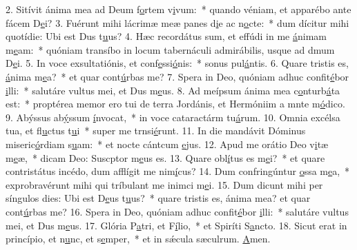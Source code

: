 2. Sitívit ánima mea ad Deum f\uline{o}rtem v\uline{i}vum:~* quando véniam, et apparébo ante fácem D\uline{e}i?
3. Fuérunt mihi lácrimæ meæ panes d\uline{i}e ac n\uline{o}cte:~* dum dícitur mihi quotídie: Ubi est Dus t\uline{u}us?
4. Hæc recordátus sum, et effúdi in me \uline{á}nimam m\uline{e}am:~* quóniam transíbo in locum tabernáculi admirábilis, usque ad dmum D\uline{e}i.
5. In voce exsultatiónis, et conf\uline{e}ssi\uline{ó}nis:~* sonus pul\uline{á}ntis.
6. Quare tristis es, \uline{á}nima m\uline{e}a?~* et quar cont\uline{ú}rbas me?
7. Spera in Deo, quóniam adhuc confit\uline{é}bor \uline{i}lli:~* salutáre vultus mei, et Dus m\uline{e}us.
8. Ad meípsum ánima mea c\uline{o}nturb\uline{á}ta est:~* proptérea memor ero tui de terra Jordánis, et Hermóniim a mnte m\uline{ó}dico.
9. Abýssus ab\uline{ý}ssum \uline{í}nvocat,~* in voce cataractárm tu\uline{á}rum.
10. Omnia excélsa tua, et fl\uline{u}ctus t\uline{u}i~* super me trnsi\uline{é}runt.
11. In die mandávit Dóminus miseric\uline{ó}rdiam s\uline{u}am:~* et nocte cántcum \uline{e}jus.
12. Apud me orátio Deo v\uline{i}tæ m\uline{e}æ,~* dicam Deo: Suscptor m\uline{e}us es.
13. Quare obl\uline{í}tus es m\uline{e}i?~* et quare contristátus incédo, dum afflígit me nim\uline{í}cus?
14. Dum confringúntur \uline{o}ssa m\uline{e}a,~* exprobravérunt mihi qui tríbulant me inimci m\uline{e}i.
15. Dum dicunt mihi per síngulos dies: Ubi est D\uline{e}us t\uline{u}us?~* quare tristis es, ánima mea? et quar cont\uline{ú}rbas me?
16. Spera in Deo, quóniam adhuc confit\uline{é}bor \uline{i}lli:~* salutáre vultus mei, et Dus m\uline{e}us.
17. Glória P\uline{a}tri, et F\uline{í}lio,~* et Spiríti S\uline{a}ncto.
18. Sicut erat in princípio, et n\uline{u}nc, et s\uline{e}mper,~* et in sǽcula sæculrum. \uline{A}men.

